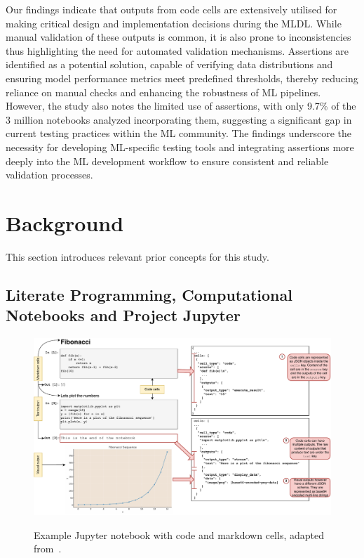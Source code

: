 Our findings indicate that outputs from code cells are extensively utilised for making critical design and implementation decisions during the MLDL. While manual validation of these outputs is common, it is also prone to inconsistencies thus highlighting the need for automated validation mechanisms. Assertions are identified as a potential solution, capable of verifying data distributions and ensuring model performance metrics meet predefined thresholds, thereby reducing reliance on manual checks and enhancing the robustness of ML pipelines. However, the study also notes the limited use of assertions, with only 9.7\% of the 3 million notebooks analyzed incorporating them, suggesting a significant gap in current testing practices within the ML community. The findings underscore the necessity for developing ML-specific testing tools and integrating assertions more deeply into the ML development workflow to ensure consistent and reliable validation processes.



\section{Background}\label{sec:background}

This section introduces relevant prior concepts for this study.

\subsection{Literate Programming, Computational Notebooks and Project Jupyter}


\begin{figure}
  \centering
  \includegraphics[width=\linewidth]{nb.pdf}
  \label{fig:nb}
  \caption{Example Jupyter notebook with code and markdown cells, adapted from~\cite[Figure~1]{pimentel2019large-scale}.}
\end{figure}

